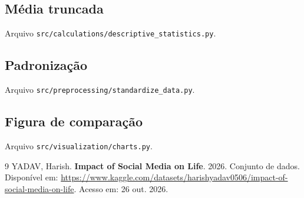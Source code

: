 \documentclass[
  article,
  12pt,
  oneside,
  a4paper,
  english,
  brazil,
  chapter=TITLE,
  section=TITLE,
  subsection=TITLE
]{abntex2}
\begin{document}


\subsection{Média truncada}

Arquivo \texttt{src/calculations/}\allowbreak\texttt{descriptive\_statistics.py}.



\subsection{Padronização}

Arquivo \texttt{src/preprocessing/}\allowbreak\texttt{standardize\_data.py}.



\subsection{Figura de comparação}

Arquivo \texttt{src/visualization/}\allowbreak\texttt{charts.py}.



\postextual

\begin{thebibliography}{9}
YADAV, Harish. \textbf{Impact of Social Media on Life}. 2026. Conjunto de dados. Disponível em: \url{https://www.kaggle.com/datasets/harishyadav0506/impact-of-social-media-on-life}. Acesso em: 26 out. 2026.
\end{thebibliography}
\end{document}
